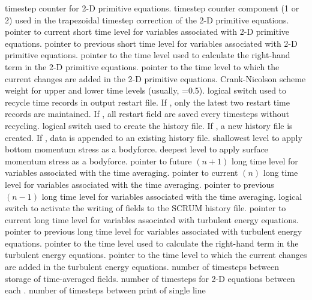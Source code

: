 \begin{klist}
\begin{klist}
           timestep counter for 2-D primitive equations.
           timestep counter component (1 or 2) used in the
    trapezoidal timestep correction of the 2-D primitive equations.
          pointer to current short time level for variables
    associated with 2-D primitive equations.
          pointer to previous short time level for variables
    associated with 2-D primitive equations.
          pointer to the time level used to calculate the
    right-hand term in the 2-D primitive equations.
          pointer to the time level to which the current
    changes are added in the 2-D primitive equations.
        Crank-Nicolson scheme weight for upper and lower
    time levels (usually, =0.5).
        logical switch used to recycle time records in
    output restart file. If , only the latest two restart
    time records are maintained.  If , all restart
    field are saved every  timesteps without recycling.
       logical switch used to create the history file.
    If , a new history file is created. If ,
    data is appended to an existing history file.
       shallowest level to apply bottom momentum stress
    as a bodyforce.
       deepest level to apply surface momentum stress as
    a bodyforce.
          pointer to future $(n+1)$ long time level for
    variables associated with the time averaging.
          pointer to current $(n)$ long time level for
    variables associated with the time averaging.
          pointer to previous $(n-1)$ long time level for
    variables associated with the time averaging.
       logical switch to activate the writing of fields
    to the SCRUM history file.   
          pointer to current long time level for variables
    associated with turbulent energy equations.
          pointer to previous long time level for variables
    associated with turbulent energy equations.
          pointer to the time level used to calculate the
    right-hand term in the turbulent energy equations.
          pointer to the time level to which the current
    changes are added in the turbulent energy equations.
          number of timesteps between storage of
    time-averaged fields.
       number of timesteps for 2-D equations between each
    .
         number of timesteps between print of single line

\end{klist}
\end{klist}
